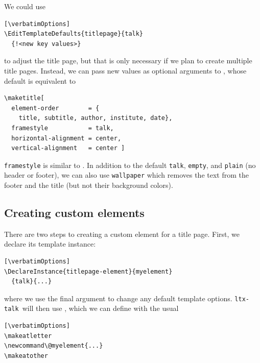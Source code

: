 \documentclass{ltugboat}
\newcommand{\verbatimOptions}{%
 \IfDocumentMetadataT{setup-code=}\small\makevmeta}
\newcommand{\ltxtalk}{\texttt{ltx-talk}}
\begin{document}
We could use
\begin{verbatim}[\verbatimOptions]
\EditTemplateDefaults{titlepage}{talk}
  {!<new key values>}
\end{verbatim}
to adjust the title page, but that is only necessary
if we plan to create multiple title pages.
Instead, we can pass new values as optional arguments to ,
whose default is equivalent to
\begin{lstlisting}
\maketitle[
  element-order        = {
    title, subtitle, author, institute, date},
  framestyle           = talk,
  horizontal-alignment = center,
  vertical-alignment   = center ]
\end{lstlisting}


\texttt{framestyle} is similar to .
In addition to the default \texttt{talk}, \texttt{empty}, and \texttt{plain}
(no header or footer),
we can also use \texttt{wallpaper} which removes the text
from the footer and the title
(but not their background colors).

\subsection{Creating custom elements}

There are two steps to creating a custom element for a title page.
First, we declare its template instance:
\begin{verbatim}[\verbatimOptions]
\DeclareInstance{titlepage-element}{myelement}
  {talk}{...}
\end{verbatim}
where we use the final argument to change any default template options.
\ltxtalk\ will then use ,
which we can define with the usual
\begin{verbatim}[\verbatimOptions]
\makeatletter
\newcommand\@myelement{...}
\makeatother
\end{verbatim}

\end{document}
